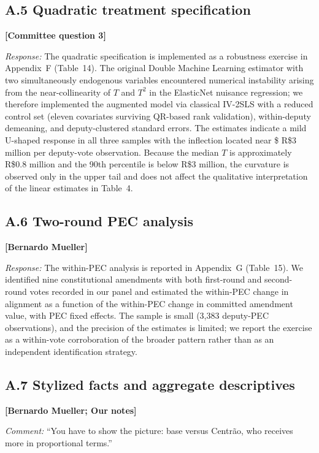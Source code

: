 \documentclass[11pt]{article}
\newcommand{\committee}[1]{\textbf{[#1]}}
\begin{document}
\subsection*{A.5 \quad Quadratic treatment specification}
\committee{Committee question 3}

\noindent\emph{Response:} The quadratic specification is implemented as a
robustness exercise in Appendix~F (Table~14). The original Double
Machine Learning estimator with two simultaneously endogenous
variables encountered numerical instability arising from the
near-collinearity of $T$ and $T^2$ in the ElasticNet nuisance
regression; we therefore implemented the augmented model via classical
IV-2SLS with a reduced control set (eleven covariates surviving
QR-based rank validation), within-deputy demeaning, and
deputy-clustered standard errors. The estimates indicate a mild
U-shaped response in all three samples with the inflection located
near \$ R\$3 million per deputy-vote observation. Because the median
$T$ is approximately R\$0.8 million and the 90th percentile is below
R\$3 million, the curvature is observed only in the upper tail and
does not affect the qualitative interpretation of the linear estimates
in Table~4.

\subsection*{A.6 \quad Two-round PEC analysis}
\committee{Bernardo Mueller}

\noindent\emph{Response:} The within-PEC analysis is reported in Appendix~G
(Table~15). We identified nine constitutional amendments with both
first-round and second-round votes recorded in our panel and estimated
the within-PEC change in alignment as a function of the within-PEC
change in committed amendment value, with PEC fixed effects. The
sample is small (3{,}383 deputy-PEC observations), and the precision
of the estimates is limited; we report the exercise as a within-vote
corroboration of the broader pattern rather than as an independent
identification strategy.

\subsection*{A.7 \quad Stylized facts and aggregate descriptives}
\committee{Bernardo Mueller; Our notes}

\noindent\emph{Comment:} ``You have to show the picture: base versus
Centrão, who receives more in proportional terms.''
\end{document}
